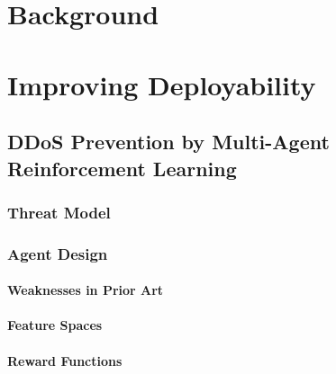 \documentclass[twoside,hidelinks]{glasgowthesis}
\begin{document}
\printglossary
\printglossary[type=\acronymtype]

\cleardoublepage
\pagestyle{fancy}
\setcounter{page}{1}





\part{Background}





\part{Improving Deployability}

\chapter{DDoS Prevention by Multi-Agent Reinforcement Learning}
\section{Threat Model}
\section{Agent Design}
\subsection{Weaknesses in Prior Art}
\subsection{Feature Spaces}
\subsection{Reward Functions}
\end{document}

